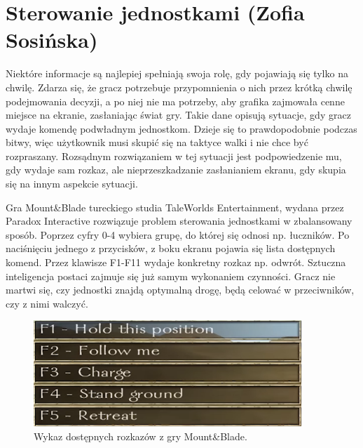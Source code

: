 \section{Sterowanie jednostkami (Zofia Sosińska)}\label{chap:mb}
Niektóre informacje są najlepiej spełniają swoja rolę, gdy pojawiają się tylko na chwilę. Zdarza się, że gracz potrzebuje przypomnienia
o nich przez krótką chwilę podejmowania decyzji, a po niej nie ma potrzeby, aby grafika zajmowała cenne miejsce na ekranie, zasłaniając świat gry.
Takie dane opisują sytuacje, gdy gracz wydaje komendę podwładnym jednostkom. Dzieje się to prawdopodobnie podczas bitwy, więc użytkownik musi skupić się
na taktyce walki i nie chce być rozpraszany. Rozsądnym rozwiązaniem w tej sytuacji jest podpowiedzenie mu, gdy wydaje sam rozkaz, ale nieprzeszkadzanie zasłanianiem ekranu,
gdy skupia się na innym aspekcie sytuacji.

Gra Mount\&Blade tureckiego studia TaleWorlds Entertainment, wydana przez Paradox Interactive rozwiązuje problem sterowania jednostkami w zbalansowany sposób.
Poprzez cyfry 0-4 wybiera grupę, do której się odnosi np. łuczników. Po naciśnięciu jednego z przycisków, z boku ekranu pojawia się lista dostępnych komend. Przez 
klawisze F1-F11 wydaje konkretny rozkaz np. odwrót. Sztuczna inteligencja postaci zajmuje się już samym wykonaniem czynności. Gracz nie martwi się,
czy jednostki znajdą optymalną drogę, będą celować w przeciwników, czy z nimi walczyć.


\begin{figure}[h!tbp]
    \centering
    \includegraphics[width=0.9\textwidth]{images/ui/commandsMountBla.png}
    \caption{Wykaz dostępnych rozkazów z gry Mount\&Blade.}\label{fig:MountnBlade}
    \label{fig:mnb}
\end{figure}
